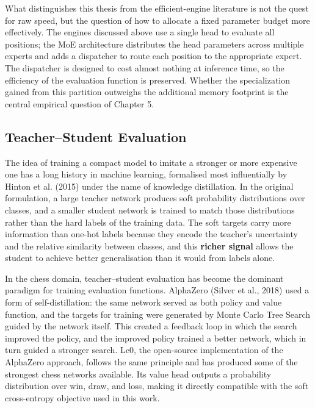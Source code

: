 What distinguishes this thesis from the efficient-engine literature is not the quest for raw speed, but the question of how to allocate a fixed parameter budget more effectively. The engines discussed above use a single head to evaluate all positions; the MoE architecture distributes the head parameters across multiple experts and adds a dispatcher to route each position to the appropriate expert. The dispatcher is designed to cost almost nothing at inference time, so the efficiency of the evaluation function is preserved. Whether the specialization gained from this partition outweighs the additional memory footprint is the central empirical question of Chapter 5.



\subsection{Teacher--Student Evaluation}

The idea of training a compact model to imitate a stronger or more expensive one has a long history in machine learning, formalised most influentially by Hinton et al. (2015) under the name of knowledge distillation. In the original formulation, a large teacher network produces soft probability distributions over classes, and a smaller student network is trained to match those distributions rather than the hard labels of the training data. The soft targets carry more information than one-hot labels because they encode the teacher's uncertainty and the relative similarity between classes, and this \textbf{richer signal} allows the student to achieve better generalisation than it would from labels alone.

In the chess domain, teacher--student evaluation has become the dominant paradigm for training evaluation functions. AlphaZero (Silver et al., 2018) used a form of self-distillation: the same network served as both policy and value function, and the targets for training were generated by Monte Carlo Tree Search guided by the network itself. This created a feedback loop in which the search improved the policy, and the improved policy trained a better network, which in turn guided a stronger search. Lc0, the open-source implementation of the AlphaZero approach, follows the same principle and has produced some of the strongest chess networks available. Its value head outputs a probability distribution over win, draw, and loss, making it directly compatible with the soft cross-entropy objective used in this work.

